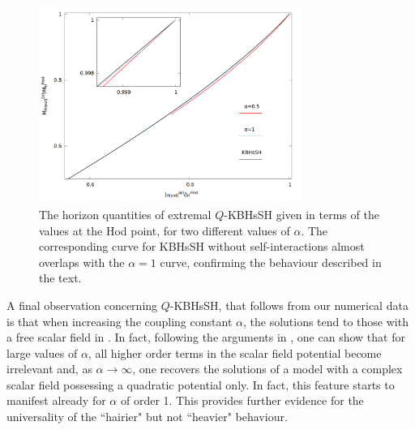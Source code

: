 \begin{figure}[h!]
  \begin{center}
    \includegraphics[width=8.55cm]{papers/selfInteractions/horizon-ratios-Q.png}
      \end{center}
      \caption{ The horizon quantities of extremal  $Q$-KBHsSH given in terms of the values at the Hod point, for two different values of $\alpha$. The corresponding curve for KBHsSH without self-interactions almost overlaps with the $\alpha=1$ curve, confirming the behaviour described in the text.}
  \label{horizon_ratios_q}
\end{figure}


A final observation concerning $Q$-KBHsSH, that follows from our numerical data 
is that 
when increasing the coupling
constant  $\alpha$,
the solutions tend to those with a free scalar field in \cite{Herdeiro:2014goa}. 
In fact, 
following the arguments in \cite{Kleihaus:2005me}, one can show that 
for large values of $\alpha$, all higher order terms in the scalar field potential become irrelevant
and, as $\alpha\to \infty$, one recovers the solutions of a model with a complex scalar field  
possessing a quadratic potential only. In fact, this feature starts to manifest already for $\alpha$  of order 1. This provides further evidence for the universality of the ``hairier" but not ``heavier" behaviour.

